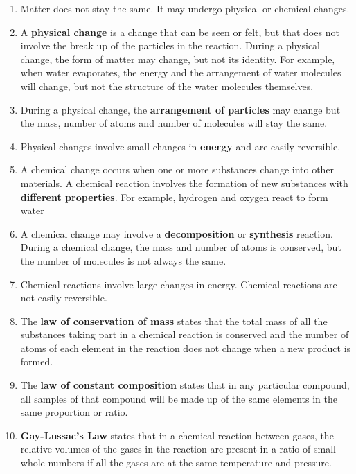       \label{m38711*id65342}\begin{enumerate}[noitemsep, label=\textbf{\arabic*}. ] 
            \label{m38711*uid40}\item Matter does not stay the same. It may undergo physical or chemical changes.
\label{m38711*uid41}\item A \textbf{physical change} is a change that can be seen or felt, but that does not involve the break up of the particles in the reaction. During a physical change, the form of matter may change, but not its identity. For example, when water evaporates, the energy and the arrangement of water molecules will change, but not the structure of the water molecules themselves.
\label{m38711*uid42}\item During a physical change, the \textbf{arrangement of particles} may change but the mass, number of atoms and number of molecules will stay the same.
\label{m38711*uid43}\item Physical changes involve small changes in \textbf{energy} and are easily reversible.
\label{m38711*uid44}\item A chemical change occurs when one or more substances change into other materials. A chemical reaction involves the formation of new substances with \textbf{different properties}. For example, hydrogen and oxygen react to form water 
\label{m38711*uid45}\item A chemical change may involve a \textbf{decomposition} or \textbf{synthesis} reaction. During a chemical change, the mass and number of atoms is conserved, but the number of molecules is not always the same.
\label{m38711*uid46}\item Chemical reactions involve large changes in energy. Chemical reactions are not easily reversible.
\label{m38711*uid48}\item The \textbf{law of conservation of mass} states that the total mass of all the substances taking part in a chemical reaction is conserved and the number of atoms of each element in the reaction does not change when a new product is formed.
\label{m38711*uid50}\item The \textbf{law of constant composition} states that in any particular compound, all samples of that compound will be made up of the same elements in the same proportion or ratio.
\label{m38711*uid51}\item \textbf{Gay-Lussac's Law} states that in a chemical reaction between gases, the relative volumes of the gases in the reaction are present in a ratio of small whole numbers if all the gases are at the same temperature and pressure.
\end{enumerate}
